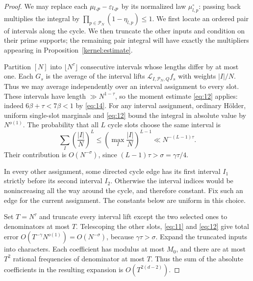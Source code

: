 \begin{proof}
We may replace each $\mu_{l,p}-\varepsilon_{l,p}$ by its normalized law
$\mu_{l,p}^{\circ}$: passing back multiplies the integral by
$\prod_{p\in\mathcal P_N}(1-\eta_{l,p})\le1$.
We first locate an ordered pair of intervals along the cycle.
We then truncate the other inputs and condition on their prime supports;
the remaining pair integral will have exactly the multipliers appearing
in Proposition~\ref{kernel:estimate}.

Partition $[N]$ into $\lfloor N^\tau\rfloor$ consecutive intervals
whose lengths differ by at most one.  Each $G_s$ is the average of the
interval lifts $\mathcal L_{I,\mathcal P_N,Q}f_s$ with weights $|I|/N$.
Thus we may average independently over an interval assignment to every
slot.  These intervals have length $\gg N^{1-\tau}$, so the moment
estimate \eqref{eq:12} applies: indeed
$6\beta+\tau<7\beta<1$ by \eqref{eq:14}.
For any interval assignment, ordinary H\"older, uniform single-slot
marginals and \eqref{eq:12} bound the integral in absolute value by
$N^{o(1)}$.
The probability that all $L$ cycle slots choose the same interval is
\[
 \sum_I\left(\frac{|I|}{N}\right)^L
 \le\left(\max_I\frac{|I|}{N}\right)^{L-1}
 \ll N^{-(L-1)\tau}.
\]
Their contribution is $O(N^{-\sigma})$, since
$(L-1)\tau>\sigma=\gamma\tau/4$.

In every other assignment, some directed cycle edge has its first
interval $I_1$ strictly before its second interval $I_2$.
Otherwise the interval indices would be nonincreasing all the way
around the cycle, and therefore constant.  Fix such an edge for the
current assignment.  The constants below are uniform in this choice.

Set $T=N^\tau$ and truncate every interval lift except the two selected
ones to denominators at most $T$.
Telescoping the other slots, \eqref{eq:11} and \eqref{eq:12} give total
error $O(T^{-\gamma}N^{o(1)})=O(N^{-\sigma})$, because
$\gamma\tau>\sigma$.
Expand the truncated inputs into characters.  Each coefficient has
modulus at most $M_0$, and there are at most $T^2$ rational frequencies
of denominator at most $T$.  Thus the sum of the absolute coefficients
in the resulting expansion is $O(T^{2(d-2)})$.


\end{proof}
